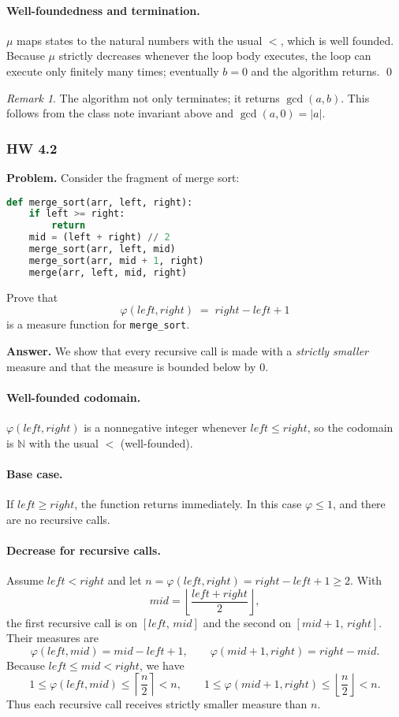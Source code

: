 \documentclass{article}
\theoremstyle{theorem}
\theoremstyle{definition}
\theoremstyle{remark}
\newtheorem{remark}[theorem]{Remark}
\begin{document}
\paragraph{Well-foundedness and termination.}
$\mu$ maps states to the natural numbers with the usual $<$, which is well founded.  
Because $\mu$ strictly decreases whenever the loop body executes, the loop can execute only finitely many times; eventually $b=0$ and the algorithm returns. \qed

\begin{remark}
The algorithm not only terminates; it returns $\gcd(a,b)$. This follows from the class note invariant above and $\gcd(a,0)=|a|$.
\end{remark}

\subsubsection*{HW 4.2}
\textbf{Problem.} Consider the fragment of merge sort:
\begin{lstlisting}[language=Python]
def merge_sort(arr, left, right):
    if left >= right:
        return
    mid = (left + right) // 2
    merge_sort(arr, left, mid)
    merge_sort(arr, mid + 1, right)
    merge(arr, left, mid, right)
\end{lstlisting}
Prove that
\[
\varphi(left,right) \;=\; right - left + 1
\]
is a measure function for \texttt{merge\_sort}.

\medskip
\textbf{Answer.}
We show that every recursive call is made with a \emph{strictly smaller} measure and that the measure is bounded below by $0$.

\paragraph{Well-founded codomain.}
$\varphi(left,right)$ is a nonnegative integer whenever $left\le right$, so the codomain is $\mathbb{N}$ with the usual $<$ (well-founded).

\paragraph{Base case.}
If $left \ge right$, the function returns immediately. In this case $\varphi \le 1$, and there are no recursive calls.

\paragraph{Decrease for recursive calls.}
Assume $left < right$ and let $n = \varphi(left,right) = right-left+1 \ge 2$. With
\[
mid = \left\lfloor \frac{left+right}{2} \right\rfloor,
\]
the first recursive call is on $[left,\,mid]$ and the second on $[mid+1,\,right]$. Their measures are
\[
\varphi(left,mid) = mid - left + 1, \qquad
\varphi(mid+1,right) = right - mid.
\]
Because $left \le mid < right$, we have
\[
1 \le \varphi(left,mid) \le \left\lceil \frac{n}{2}\right\rceil < n,\qquad
1 \le \varphi(mid+1,right) \le \left\lfloor \frac{n}{2}\right\rfloor < n.
\]
Thus each recursive call receives strictly smaller measure than $n$.
\end{document}

